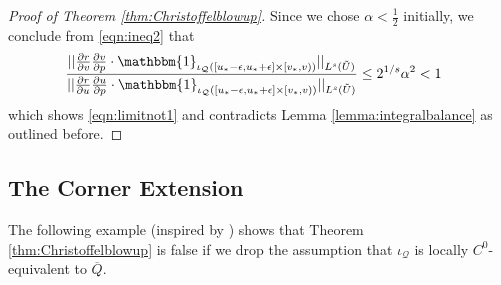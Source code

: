 \documentclass{article}
\newcommand{\Q}{\mathcal{Q}}
\begin{document}
\begin{proof}[Proof of Theorem \ref{thm:Christoffelblowup}]
Since we chose $\alpha<\frac{1}{2}$ initially, we conclude from \eqref{eqn:ineq2} that
\begin{equation}
\begin{split}
            \frac{|| \frac{\partial r}{\partial v}\frac{\partial v}{\partial p}\cdot \mathbbm{1}_{\iota_{\Q}([u_* - \epsilon, u_* + \epsilon]\times [v_*,v))}||_{L^{s}(\tilde{U})}}{||\frac{\partial r}{\partial u}\frac{\partial u}{\partial p} \cdot \mathbbm{1}_{\iota_{\Q}([u_* - \epsilon, u_* + \epsilon]\times [v_*,v))}||_{L^{s}(\tilde{U})}}&\leq 2^{1/s}\alpha^{2}<1
\end{split}
\end{equation}
  which shows \eqref{eqn:limitnot1} and contradicts Lemma \ref{lemma:integralbalance} as outlined before.
    \end{proof}
  
    
\subsection{The Corner Extension}\label{The Corner Extension}
The following example (inspired by \cite[Example 4.1]{CameronSbierski}) shows that Theorem \ref{thm:Christoffelblowup} is false if we drop the assumption that $\iota_\Q$ is locally $C^0$-equivalent to $\overline{Q}$. 
\end{document}
